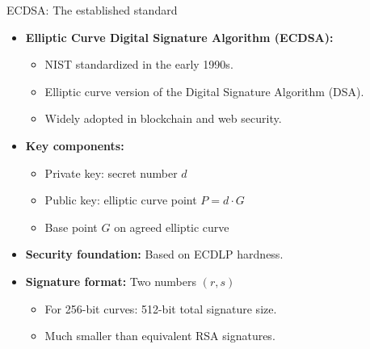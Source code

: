 \documentclass[aspectratio=169, lualatex, handout]{beamer}
\begin{document}
\begin{frame}{ECDSA: The established standard}
	\begin{itemize}[<+->]
		\item \textbf{Elliptic Curve Digital Signature Algorithm (ECDSA):}
		      \begin{itemize}
			      \item NIST standardized in the early 1990s.
			      \item Elliptic curve version of the Digital Signature Algorithm (DSA).
			      \item Widely adopted in blockchain and web security.
		      \end{itemize}
		\item \textbf{Key components:}
		      \begin{itemize}
			      \item Private key: secret number $d$
			      \item Public key: elliptic curve point $P = d \cdot G$
			      \item Base point $G$ on agreed elliptic curve
		      \end{itemize}
		\item \textbf{Security foundation:} Based on ECDLP hardness.
		\item \textbf{Signature format:} Two numbers $(r, s)$
		      \begin{itemize}
			      \item For 256-bit curves: 512-bit total signature size.
			      \item Much smaller than equivalent RSA signatures.
		      \end{itemize}
	\end{itemize}
\end{frame}
\end{document}
